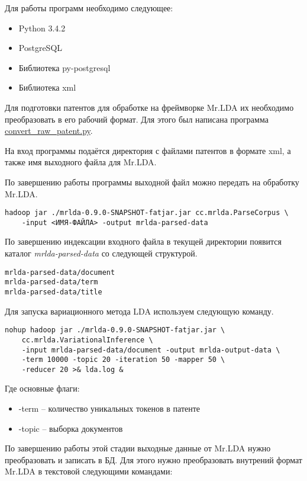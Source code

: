 Для работы программ необходимо следующее:
\begin{itemize}
    \item Python 3.4.2
    \item PostgreSQL
    \item Библиотека py-postgresql
    \item Библиотека xml
\end{itemize}

Для подготовки патентов для обработке на фреймворке Mr.LDA их необходимо преобразовать в его рабочий 
формат. Для этого был написана программа \href{https://github.com/SemPatent/Golubev/blob/master/convert_raw_patent.py}{convert\_raw\_patent.py}.

На вход программы подаётся директория с файлами патентов в формате xml, а также имя выходного файла 
для Mr.LDA.

По завершению работы программы выходной файл можно передать на обработку Mr.LDA. 
\begin{verbatim}
hadoop jar ./mrlda-0.9.0-SNAPSHOT-fatjar.jar cc.mrlda.ParseCorpus \
    -input <ИМЯ-ФАЙЛА> -output mrlda-parsed-data
\end{verbatim}

По завершению индексации входного файла в текущей директории появится каталог \emph{mrlda-parsed-data} 
со следующей структурой.
\begin{verbatim}
mrlda-parsed-data/document
mrlda-parsed-data/term
mrlda-parsed-data/title
\end{verbatim}

Для запуска вариационного метода LDA используем следующую команду. 
\begin{verbatim}
nohup hadoop jar ./mrlda-0.9.0-SNAPSHOT-fatjar.jar \
    cc.mrlda.VariationalInference \
    -input mrlda-parsed-data/document -output mrlda-output-data \
    -term 10000 -topic 20 -iteration 50 -mapper 50 \
    -reducer 20 >& lda.log &
\end{verbatim}

\pagebreak

Где основные флаги:
\begin{itemize}
    \item -term -- количество уникальных токенов в патенте
    \item -topic -- выборка документов
\end{itemize}

По завершению работы этой стадии выходные данные от Mr.LDA нужно преобразовать и записать в БД. 
Для этого нужно преобразовать внутрений формат Mr.LDA в текстовой следующими командами:


